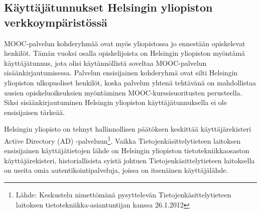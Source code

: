 \documentclass[finnish,gradu]{tktltiki}
\begin{document}





  \subsection{Käyttäjätunnukset Helsingin yliopiston verkkoympäristössä} %
  \label{sub:autentikointi_helsingin_yliopiston_verkkoympäristössä}

  MOOC-palvelun kohderyhmää ovat myös yliopistossa jo ennestään opiskelevat henkilöt. Tämän vuoksi osalla opiskelijoista on Helsingin yliopiston myöntämä käyttäjätunnus, jota olisi käytännöllistä soveltaa MOOC-palvelun sisäänkirjautumisessa. Palvelun ensisijainen kohderyhmä ovat silti Helsingin yliopiston ulkopuoliset henkilöt, koska palvelun yhtenä tehtävänä on mahdollistaa uusien opiskeluoikeuksien myöntäminen MOOC-kurssisuoritusten perusteella. Siksi sisäänkirjautuminen Helsingin yliopiston käyttäjätunnuksella ei ole ensisijaisen tärkeää.

  Helsingin yliopisto on tehnyt hallinnollisen päätöksen keskittää käyttäjärekisteri Active Directory (AD) -palveluun\footnote{Lähde: Keskustelu nimettömänä pysyttelevän Tietojenkäsittelytieteen laitoksen tietotekniikka-asiantuntijan kanssa 26.1.2012}. Vaikka Tietojenkäsittelytieteen laitoksen ensisijainen käyttäjätietojen lähde on Helsingin yliopiston tietotekniikkaosaston käyttäjärekisteri, historiallisista syistä johtuen Tietojenkäsittelytieteen laitoksella on useita omia autentikointipalveluja, joissa on itsenäinen käyttäjälähde.
\end{document}
